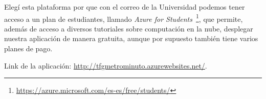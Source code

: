Elegí esta plataforma por que con el correo de la Universidad podemos tener acceso a un plan de estudiantes, llamado \textit{Azure for Students}~\footnote{\url{https://azure.microsoft.com/es-es/free/students/}}, que permite, además de acceso a diversos tutoriales sobre computación en la nube, desplegar nuestra aplicación de manera gratuita, aunque por supuesto también tiene varios planes de pago.


Link de la aplicación: \url{http://tfgmetrominuto.azurewebsites.net/}.